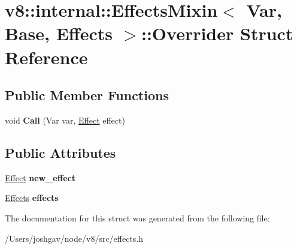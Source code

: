 \hypertarget{structv8_1_1internal_1_1_effects_mixin_1_1_overrider}{}\section{v8\+:\+:internal\+:\+:Effects\+Mixin$<$ Var, Base, Effects $>$\+:\+:Overrider Struct Reference}
\label{structv8_1_1internal_1_1_effects_mixin_1_1_overrider}
\subsection*{Public Member Functions}
\begin{DoxyCompactItemize}
\item 
void {\bfseries Call} (Var var, \hyperlink{structv8_1_1internal_1_1_effect}{Effect} effect)\hypertarget{structv8_1_1internal_1_1_effects_mixin_1_1_overrider_a289d67b4f359bf08d7f95fd3b2bac728}{}\label{structv8_1_1internal_1_1_effects_mixin_1_1_overrider_a289d67b4f359bf08d7f95fd3b2bac728}

\end{DoxyCompactItemize}
\subsection*{Public Attributes}
\begin{DoxyCompactItemize}
\item 
\hyperlink{structv8_1_1internal_1_1_effect}{Effect} {\bfseries new\+\_\+effect}\hypertarget{structv8_1_1internal_1_1_effects_mixin_1_1_overrider_adc2797f3dd5b606f0326014fee540f5f}{}\label{structv8_1_1internal_1_1_effects_mixin_1_1_overrider_adc2797f3dd5b606f0326014fee540f5f}

\item 
\hyperlink{classv8_1_1internal_1_1_effects}{Effects} {\bfseries effects}\hypertarget{structv8_1_1internal_1_1_effects_mixin_1_1_overrider_af11d1e55720d9381f427f0ffb6b01fab}{}\label{structv8_1_1internal_1_1_effects_mixin_1_1_overrider_af11d1e55720d9381f427f0ffb6b01fab}

\end{DoxyCompactItemize}


The documentation for this struct was generated from the following file\+:\begin{DoxyCompactItemize}
\item 
/\+Users/joshgav/node/v8/src/effects.\+h\end{DoxyCompactItemize}
